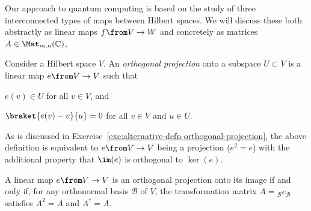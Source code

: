 \documentclass[a4paper,oneside, 12pt]{amsart}
\begin{document}
Our approach to quantum computing is based on the study of three interconnected types of maps between Hilbert spaces.
We will discuss these both abstractly as linear maps \(f \from V \to W\) and concretely as matrices \(A \in \Mat_{m,n}( \mathbb{C})\).

\begin{definition}\label{def:orthogonal-projection}
  Consider a Hilbert space \(V\).
  An \emph{orthogonal projection} onto a subspace \( U \subset V \) is a linear map \( e\from V \to V \) such that
  \begin{thmlist}
    \item \( e(v) \in U \) for all \( v \in V \), and
    \item \( \braket{e(v) - v}{u} = 0 \) for all \( v \in V \) and \( u \in U \).
  \end{thmlist}
\end{definition}

As is discussed in Exercise~\ref{exe:alternative-defn-orthogonal-projection}, the above definition is equivalent to \( e\from V\to V \) being a projection (\ie \( e^2 = e \)) with the additional property that \( \im(e) \) is orthogonal to \( \ker(e) \).

\begin{lemma}\label{lem:representing-orthogonal-projection}
  A linear map \( e \from V \to V \) is an orthogonal projection onto its image if and only if, for any orthonormal basis \( \mathcal{B} \) of \( V \), the transformation matrix \( A = {_{\mathcal{B}}} e_{\mathcal{B}}\) satisfies \(A^{2} = A\) and \(A^{\dagger} = A\).
\end{lemma}
\end{document}
